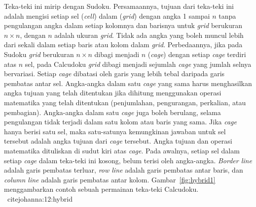 Teka-teki ini mirip dengan Sudoku. Persamaannya, tujuan dari teka-teki ini adalah mengisi setiap sel (\textit{cell}) dalam (\textit{grid}) dengan angka 1 sampai \begin{math}n\end{math} tanpa pengulangan angka dalam setiap kolomnya dan barisnya untuk \textit{grid} berukuran \begin{math}n \times n\end{math}, dengan \begin{math}n\end{math} adalah ukuran \textit{grid}. Tidak ada angka yang boleh muncul lebih dari sekali dalam setiap baris atau kolom dalam \textit{grid}. Perbedaannya, jika pada Sudoku \textit{grid} berukuran \begin{math}n \times n\end{math} dibagi menjadi \begin{math}n\end{math} (\textit{cage}) dengan setiap \textit{cage} terdiri atas \begin{math}n\end{math} sel, pada Calcudoku \textit{grid} dibagi menjadi sejumlah \textit{cage} yang jumlah selnya bervariasi. Setiap \textit{cage} dibatasi oleh garis yang lebih tebal daripada garis pembatas antar sel. Angka-angka dalam satu \textit{cage} yang sama harus menghasilkan angka tujuan yang telah ditentukan jika dihitung menggunakan operasi matematika yang telah ditentukan (penjumlahan, pengurangan, perkalian, atau pembagian). Angka-angka dalam satu \textit{cage} juga boleh berulang, selama pengulangan tidak terjadi dalam satu kolom atau baris yang sama. Jika \textit{cage} hanya berisi satu sel, maka satu-satunya kemungkinan jawaban untuk sel tersebut adalah angka tujuan dari \textit{cage} tersebut. Angka tujuan dan operasi matematika dituliskan di sudut kiri atas \textit{cage}. Pada awalnya, setiap sel dalam setiap \textit{cage} dalam teka-teki ini kosong, belum terisi oleh angka-angka. \textit{Border line} adalah garis pembatas terluar, \textit{row line} adalah garis pembatas antar baris, dan \textit{column line} adalah garis pembatas antar kolom. Gambar~\ref{fig:hybrid1} menggambarkan contoh sebuah permainan teka-teki Calcudoku. ~\cite{fahda:16:backtracking} ~cite{johanna:12:hybrid}


